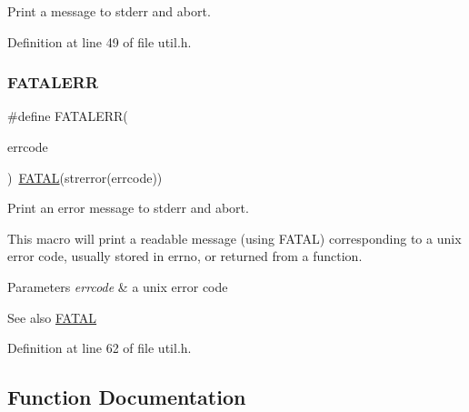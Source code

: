 Print a message to stderr and abort. 



Definition at line 49 of file util.\+h.

\mbox{\label{group__check__macros_gab2b3925a76d34a1272ace73af5a81945}} 
\subsubsection{\texorpdfstring{F\+A\+T\+A\+L\+E\+RR}{FATALERR}}
{\footnotesize\ttfamily \#define F\+A\+T\+A\+L\+E\+RR(\begin{DoxyParamCaption}\item[{}]{errcode }\end{DoxyParamCaption})~\hyperlink{group__check__macros_ga7a3e1d362790a375466c5e77a6d5c9c5}{F\+A\+T\+AL}(strerror(errcode))}



Print an error message to stderr and abort. 

This macro will print a readable message (using {\ttfamily F\+A\+T\+AL}) corresponding to a unix error code, usually stored in {\ttfamily errno}, or returned from a function.


\begin{DoxyParams}{Parameters}
{\em errcode} & a unix error code \\
\hline
\end{DoxyParams}
\begin{DoxySeeAlso}{See also}
\hyperlink{group__check__macros_ga7a3e1d362790a375466c5e77a6d5c9c5}{F\+A\+T\+AL} 
\end{DoxySeeAlso}


Definition at line 62 of file util.\+h.



\subsection{Function Documentation}
\mbox{\label{group__check__macros_ga1d16f442903359e8146370c52297334c}} 
